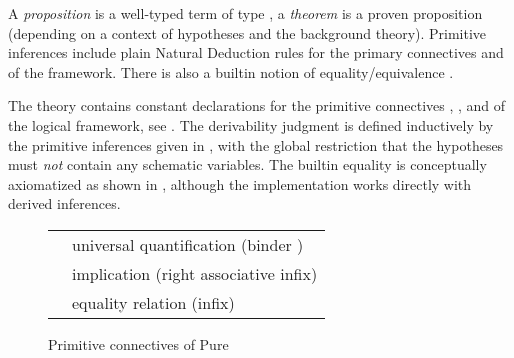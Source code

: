 \begin{isabellebody}
\begin{isamarkuptext}
\begin{description}
  \end{description}%
\end{isamarkuptext}%
\isamarkuptrue%
%
\endisatagmlantiq
{\isafoldmlantiq}%
%
\isadelimmlantiq
%
\endisadelimmlantiq
%
\isamarkuptrue%
%
\begin{isamarkuptext}%
A \emph{proposition} is a well-typed term of type , a
  \emph{theorem} is a proven proposition (depending on a context of
  hypotheses and the background theory).  Primitive inferences include
  plain Natural Deduction rules for the primary connectives \isa{{\isasymAnd}} and \isa{{\isasymLongrightarrow}} of the framework.  There is also a builtin
  notion of equality/equivalence \isa{{\isasymequiv}}.%
\end{isamarkuptext}%
\isamarkuptrue%
%
\isamarkuptrue%
%
\begin{isamarkuptext}%
The theory  contains constant declarations for the
  primitive connectives \isa{{\isasymAnd}}, \isa{{\isasymLongrightarrow}}, and \isa{{\isasymequiv}} of
  the logical framework, see .  The
  derivability judgment  is
  defined inductively by the primitive inferences given in
  , with the global restriction that the
  hypotheses must \emph{not} contain any schematic variables.  The
  builtin equality is conceptually axiomatized as shown in
  , although the implementation works
  directly with derived inferences.

  \begin{figure}[htb]
  \begin{center}
  \begin{tabular}{ll}
  \isa{all\ {\isacharcolon}{\isacharcolon}\ {\isacharparenleft}{\isasymalpha}\ {\isasymRightarrow}\ prop{\isacharparenright}\ {\isasymRightarrow}\ prop} & universal quantification (binder \isa{{\isasymAnd}}) \\
  \isa{{\isasymLongrightarrow}\ {\isacharcolon}{\isacharcolon}\ prop\ {\isasymRightarrow}\ prop\ {\isasymRightarrow}\ prop} & implication (right associative infix) \\
  \isa{{\isasymequiv}\ {\isacharcolon}{\isacharcolon}\ {\isasymalpha}\ {\isasymRightarrow}\ {\isasymalpha}\ {\isasymRightarrow}\ prop} & equality relation (infix) \\
  \end{tabular}
  \caption{Primitive connectives of Pure}\label{fig:pure-connectives}
  \end{center}
  \end{figure}


\end{isamarkuptext}
\end{isabellebody}
